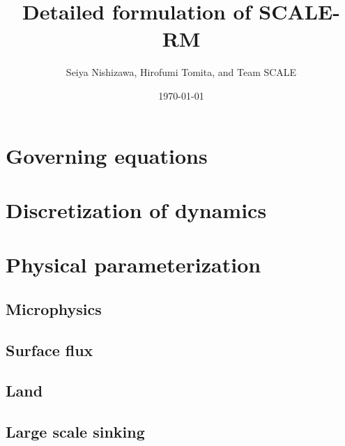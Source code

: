 \documentclass[a4paper]{report}
\title{{\LARGE Detailed formulation of SCALE-RM}}
\author{Seiya Nishizawa, Hirofumi Tomita, and Team SCALE}
\date{\today}
\begin{document}
\maketitle
\tableofcontents




\chapter{Governing equations}


\chapter{Discretization of dynamics}
\label{chap:discretization dynamics}














\chapter{Physical parameterization}



\section{Microphysics}






\section{Surface flux}


\section{Land}


%

\section{Large scale sinking}





\appendix





\end{document}
